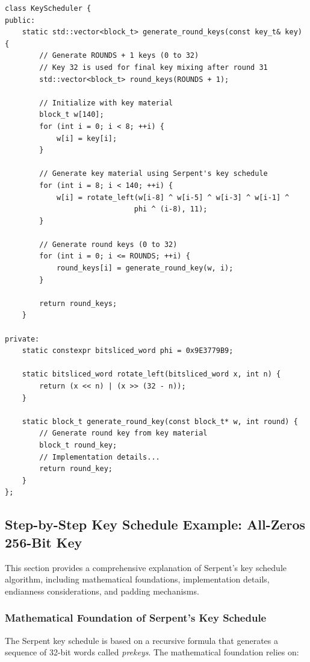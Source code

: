 \documentclass[12pt,a4paper]{article}
\begin{document}
\begin{lstlisting}[caption=Serpent Key Scheduling]
class KeyScheduler {
public:
    static std::vector<block_t> generate_round_keys(const key_t& key) {
        // Generate ROUNDS + 1 keys (0 to 32)
        // Key 32 is used for final key mixing after round 31
        std::vector<block_t> round_keys(ROUNDS + 1);
        
        // Initialize with key material
        block_t w[140];
        for (int i = 0; i < 8; ++i) {
            w[i] = key[i];
        }
        
        // Generate key material using Serpent's key schedule
        for (int i = 8; i < 140; ++i) {
            w[i] = rotate_left(w[i-8] ^ w[i-5] ^ w[i-3] ^ w[i-1] ^ 
                              phi ^ (i-8), 11);
        }
        
        // Generate round keys (0 to 32)
        for (int i = 0; i <= ROUNDS; ++i) {
            round_keys[i] = generate_round_key(w, i);
        }
        
        return round_keys;
    }

private:
    static constexpr bitsliced_word phi = 0x9E3779B9;
    
    static bitsliced_word rotate_left(bitsliced_word x, int n) {
        return (x << n) | (x >> (32 - n));
    }
    
    static block_t generate_round_key(const block_t* w, int round) {
        // Generate round key from key material
        block_t round_key;
        // Implementation details...
        return round_key;
    }
};
\end{lstlisting}

\subsection{Step-by-Step Key Schedule Example: All-Zeros 256-Bit Key}

This section provides a comprehensive explanation of Serpent's key schedule algorithm, including mathematical foundations, implementation details, endianness considerations, and padding mechanisms.

\subsubsection{Mathematical Foundation of Serpent's Key Schedule}

The Serpent key schedule is based on a recursive formula that generates a sequence of 32-bit words called \textit{prekeys}. The mathematical foundation relies on:
\end{document}

